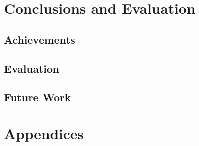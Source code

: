 \documentclass[a4paper,12pt]{report}
\begin{document}
\chapter{Conclusions and Evaluation}
\label{conc_eval_sec}
\section{Achievements}


\section{Evaluation}

\section{Future Work}

\appendix

\printbibliography

\chapter{Appendices}

\end{document}
